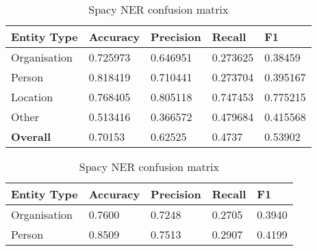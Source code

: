         \begin{table}[h]
            \centering
            \begin{subtable}{\textwidth}
                \centering
                \begin{tabular}{|l|l|l|l|l|} 
                \hline
                \textbf{Entity Type} & \textbf{Accuracy}                           & \textbf{Precision}                          & \textbf{Recall}                             & \textbf{F1}                                  \\ 
                \hline
                Organisation         & {0.725973} & {0.646951} & {0.273625} & {0.38459}   \\ 
                \hline
                Person               & {0.818419} & {0.710441} & {0.273704} & {0.395167}  \\ 
                \hline
                Location             & {0.768405} & {0.805118} & {0.747453} & {0.775215}  \\ 
                \hline
                Other                & {0.513416} & {0.366572} & {0.479684} & {0.415568}  \\ 
                \hline
                \textbf{Overall}     & {0.70153}  & {0.62525}  & {0.4737}   & {0.53902}   \\
                \hline
                \end{tabular}
                \smallskip
                \caption{Spacy NER confusion matrix} \label{sub:spacy}
            \end{subtable}
            \bigskip
            \begin{subtable}{\textwidth}
                \centering
                \begin{tabular}{|l|l|l|l|l|} 
                \hline
                \textbf{Entity Type} & \textbf{Accuracy}                                                              & \textbf{Precision}                                                             & \textbf{Recall}                                                                & \textbf{F1}                                                                     \\ 
                \hline
                Organisation         & {}{0.7600}  & {0.7248}                                    & {0.2705}                                    & {0.3940}                                     \\ 
                \hline
                Person               & {0.8509}                                    & {0.7513}                                    & {0.2907}                                    & {}{0.4199}  \\ 

\end{tabular}
\end{subtable}
\end{table}
